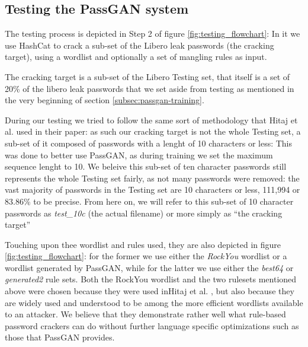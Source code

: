 \subsection{Testing the PassGAN system}\label{subsec:passgan-testing}
The testing process is depicted in Step 2 of figure \ref{fig:testing_flowchart}: In it we use HashCat to crack a sub-set of the Libero leak passwords (the cracking target), using a wordlist and optionally a set of mangling rules as input.

The cracking target is a sub-set of the Libero Testing set, that itself is a set of 20\% of the libero leak passwords that we set aside from testing as mentioned in the very beginning of section \ref{subsec:passgan-training}.

During our testing we tried to follow the same sort of methodology that Hitaj et al.\cite{PassGAN} used in their paper: as such our cracking target is not the whole Testing set, a sub-set of it composed of passwords with a lenght of 10 characters or less: This was done to better use PassGAN, as during training we set the maximum sequence lenght to 10.
We beleive this sub-set of ten character passwords still represents the whole Testing set fairly, as not many passwords were removed: the vast majority of passwords in the Testing set are 10 characters or less, 111,994 or 83.86\% to be precise. 
From here on, we will refer to this sub-set of 10 character passwords as \emph{test\_10c} (the actual filename) or more simply as \enquote{the cracking target}


Touching upon thee wordlist and rules used, they are also depicted in figure \ref{fig:testing_flowchart}: for the former we use either the \emph{RockYou} wordlist or a wordlist generated by PassGAN, while for the latter we use either the \emph{best64} or \emph{generated2} rule sets. Both the RockYou wordlist and the two rulesets mentioned above were chosen because they were used inHitaj et al. \cite{PassGAN}, but also because they are widely used and understood to be among the more efficient wordlists available to an attacker. We believe that they demonstrate rather well what rule-based password crackers can do without further language specific optimizations such as those that PassGAN provides. %

